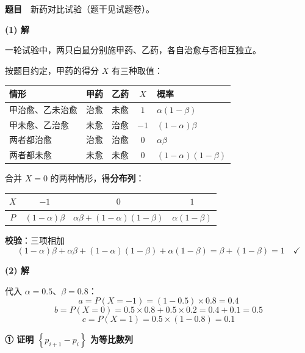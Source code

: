 \par\medskip


\textbf{题目}　新药对比试验（题干见试题卷）。

\par\medskip

\textbf{(1) 解}

一轮试验中，两只白鼠分别施甲药、乙药，各自治愈与否相互独立。

按题目约定，甲药的得分 $X$ 有三种取值：

\begin{center}
\begin{tabular}{lcccl}
\toprule
情形 & 甲药 & 乙药 & $X$ & 概率 \\
\midrule
甲治愈、乙未治愈 & 治愈 & 未愈 & $1$ & $\alpha(1-\beta)$ \\
甲未愈、乙治愈 & 未愈 & 治愈 & $-1$ & $(1-\alpha)\beta$ \\
两者都治愈 & 治愈 & 治愈 & $0$ & $\alpha\beta$ \\
两者都未愈 & 未愈 & 未愈 & $0$ & $(1-\alpha)(1-\beta)$ \\
\bottomrule
\end{tabular}
\end{center}

合并 $X=0$ 的两种情形，得\textbf{分布列}：

\begin{center}
\begin{tabular}{cccc}
\toprule
$X$ & $-1$ & $0$ & $1$ \\
\midrule
$P$ & $(1-\alpha)\beta$ & $\alpha\beta+(1-\alpha)(1-\beta)$ & $\alpha(1-\beta)$ \\
\bottomrule
\end{tabular}
\end{center}

\textbf{校验}：三项相加
\[(1-\alpha)\beta+\alpha\beta+(1-\alpha)(1-\beta)+\alpha(1-\beta)=\beta+(1-\beta)=1\quad\checkmark\]

\par\medskip

\textbf{(2) 解}

代入 $\alpha=0.5$、$\beta=0.8$：
\[a=P(X=-1)=(1-0.5)\times0.8=0.4\]
\[b=P(X=0)=0.5\times0.8+0.5\times0.2=0.4+0.1=0.5\]
\[c=P(X=1)=0.5\times(1-0.8)=0.1\]

\par\medskip

\textbf{① 证明 $\left\{p_{i+1}-p_i\right\}$ 为等比数列}

